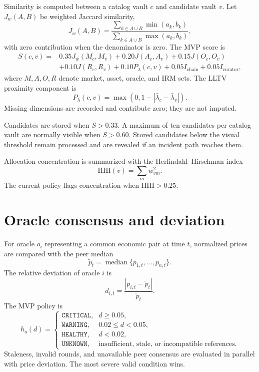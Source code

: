 \documentclass[11pt,a4paper]{article}
\begin{document}
Similarity is computed between a catalog vault $c$ and candidate vault $v$.
Let $J_w(A,B)$ be weighted Jaccard similarity,
\begin{equation}
J_w(A,B)=\frac{\sum_{k\in A\cup B}\min(a_k,b_k)}
                   {\sum_{k\in A\cup B}\max(a_k,b_k)},
\end{equation}
with zero contribution when the denominator is zero.  The MVP score is
\begin{align}
S(c,v)={}&0.35J_w(M_c,M_v)+0.20J(A_c,A_v)+0.15J(O_c,O_v)\nonumber\\
        &+0.10J(R_c,R_v)+0.10P_{\lambda}(c,v)
          +0.05I_{\mathrm{chain}}+0.05I_{\mathrm{curator}},
\end{align}
where $M,A,O,R$ denote market, asset, oracle, and IRM sets.  The LLTV proximity
component is
\begin{equation}
P_{\lambda}(c,v)=\max\left(0,1-|\bar\lambda_c-\bar\lambda_v|\right).
\end{equation}
Missing dimensions are recorded and contribute zero; they are not imputed.

Candidates are stored when $S>0.33$.  A maximum of ten candidates per catalog
vault are normally visible when $S>0.60$.  Stored candidates below the visual
threshold remain processed and are revealed if an incident path reaches them.

Allocation concentration is summarized with the Herfindahl--Hirschman index
\begin{equation}
\mathrm{HHI}(v)=\sum_m w_{vm}^{2}.
\end{equation}
The current policy flags concentration when $\mathrm{HHI}>0.25$.

\section{Oracle consensus and deviation}

For oracle $o_i$ representing a common economic pair at time $t$, normalized
prices are compared with the peer median
\begin{equation}
\widetilde p_t=\operatorname{median}\{p_{1,t},\ldots,p_{n,t}\}.
\end{equation}
The relative deviation of oracle $i$ is
\begin{equation}
d_{i,t}=\frac{|p_{i,t}-\widetilde p_t|}{\widetilde p_t}.
\end{equation}
The MVP policy is
\begin{equation}
h_o(d)=
\begin{cases}
\texttt{CRITICAL}, & d\geq 0.05,\\
\texttt{WARNING}, & 0.02\leq d<0.05,\\
\texttt{HEALTHY}, & d<0.02,\\
\texttt{UNKNOWN}, & \text{insufficient, stale, or incompatible references.}
\end{cases}
\end{equation}
Staleness, invalid rounds, and unavailable peer consensus are evaluated in
parallel with price deviation.  The most severe valid condition wins.
\end{document}
